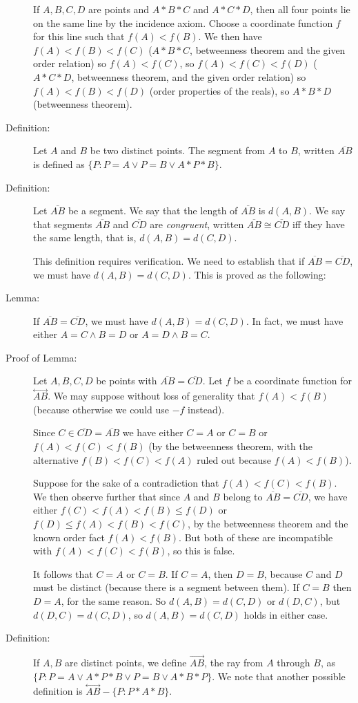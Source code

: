 \documentclass[12pt]{article}
\newcommand\Line[1]{\overset{\leftrightarrow}{#1}}
\begin{document}
\begin{description}
If $A,B,C,D$ are points and $A*B*C$ and $A*C*D$, then all four points lie on the same line by the incidence axiom.  Choose a coordinate function $f$ for this line such that $f(A)<f(B)$.  We then have $f(A)<f(B)<f(C)$ ($A*B*C$, betweenness theorem and the given order relation) so $f(A)<f(C)$, so $f(A)<f(C)<f(D)$ ($A*C*D$, betweenness theorem, and the given order relation) so $f(A)<f(B)<f(D)$ (order properties of the reals), so $A*B*D$ (betweenness theorem).

\item[Definition:]  Let $A$ and $B$ be two distinct points.  The segment from $A$ to $B$, written $\overline{AB}$ is defined as $\{P: P = A \vee P = B \vee A * P * B\}$.

\item[Definition:]  Let $\overline{AB}$ be a segment.   We say that the length of $\overline{AB}$ is $d(A,B)$.  We say that segments $\overline{AB}$ and $\overline{CD}$ are {\em congruent\/}, written $\overline{AB} \cong \overline{CD}$ iff they have the same length, that is, $d(A,B) = d(C,D)$.

This definition requires verification.  We need to establish that if $\overline{AB} = \overline{CD}$, we must have $d(A,B) = d(C,D)$.  This is proved as the following:

\item[Lemma:]  If $\overline{AB} = \overline{CD}$, we must have $d(A,B) = d(C,D)$.  In fact, we must have either $A=C \wedge B=D$ or $A=D \wedge B=C$.

\item[Proof of Lemma:]  Let $A,B,C,D$ be points with $\overline{AB} = \overline{CD}$.  Let $f$ be a coordinate function for $\Line{AB}$.  We may suppose without loss of generality that $f(A) < f(B)$ (because otherwise we could use $-f$ instead).

Since $C \in \overline{CD} = \overline{AB}$ we have either $C=A$ or $C=B$ or $f(A)<f(C)<f(B)$ (by the betweenness theorem, with the alternative $f(B) < f(C) < f(A)$ ruled out because $f(A) < f(B)$).

Suppose for the sake of a contradiction that $f(A)<f(C)<f(B)$.  We then observe further that since $A$ and $B$ belong to $\overline{AB} = \overline{CD}$, we
have either $f(C) < f(A) < f(B) \leq f(D)$ or $f(D) \leq f(A) < f(B) <f(C)$, by the betweenness theorem and the known order fact $f(A) < f(B)$.  But both of these are incompatible with $f(A)<f(C)<f(B)$, so this is false.

It follows that $C=A$ or $C=B$.  If $C=A$, then $D=B$, because $C$ and $D$ must be distinct (because there is a segment between them).  If $C=B$ then $D=A$, for the same reason.  So $d(A,B) = d(C,D)$ or $d(D,C)$, but $d(D,C)=d(C,D)$, so $d(A,B) = d(C,D)$ holds in either case.

\item[Definition:]  If $A,B$ are distinct points, we define $\overrightarrow{AB}$, the ray from $A$ through $B$, as $\{P:P = A \vee A*P*B \vee P=B \vee A*B*P\}$.  We note that another possible definition is $\Line{AB} - \{P:P*A*B\}$.

\end{description}
\end{document}
